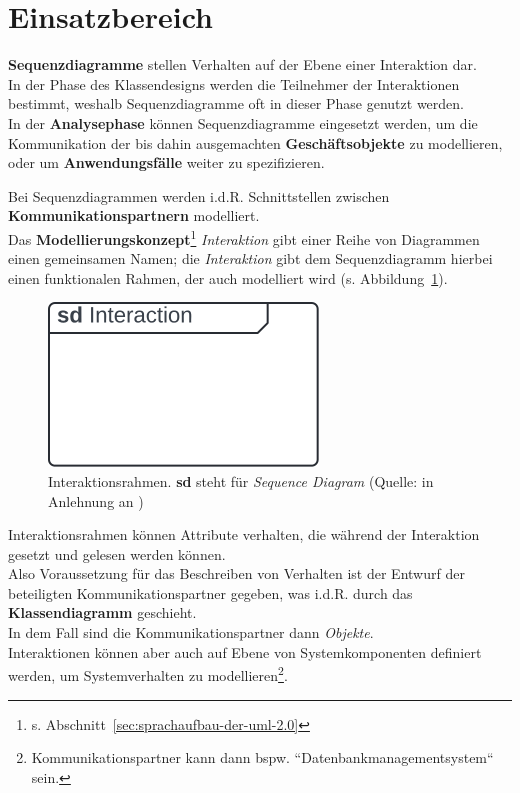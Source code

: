 \section{Einsatzbereich}

\begin{tcolorbox}
    \textbf{Sequenzdiagramme} stellen Verhalten auf der Ebene einer Interaktion dar.\\
    In der Phase des Klassendesigns werden die Teilnehmer der Interaktionen bestimmt, weshalb Sequenzdiagramme oft in dieser Phase genutzt werden.\\
    In der \textbf{Analysephase} können Sequenzdiagramme eingesetzt werden, um die Kommunikation der bis dahin ausgemachten \textbf{Geschäftsobjekte} zu modellieren, oder um \textbf{Anwendungsfälle} weiter zu spezifizieren.
\end{tcolorbox}

\noindent
Bei Sequenzdiagrammen werden i.d.R. Schnittstellen zwischen \textbf{Kommunikationspartnern} modelliert.\\

\noindent
Das \textbf{Modellierungskonzept}\footnote{
s. Abschnitt~\ref{sec:sprachaufbau-der-uml-2.0}
} \textit{Interaktion} gibt einer Reihe von Diagrammen einen gemeinsamen Namen; die \textit{Interaktion} gibt dem Sequenzdiagramm hierbei einen funktionalen Rahmen, der auch modelliert wird (s. Abbildung~\ref{fig:interaktionsrahmen}).\\

\begin{figure}
    \centering
    \includegraphics[scale=0.5]{part three/Sequenzdiagramme/img/interaktionsrahmen}
    \caption{Interaktionsrahmen. \textbf{sd} steht für \textit{Sequence Diagram} (Quelle: in Anlehnung an \cite[596]{OMG17})}
    \label{fig:interaktionsrahmen}
\end{figure}

\noindent
Interaktionsrahmen können Attribute verhalten, die während der Interaktion gesetzt und gelesen werden können.\\

\noindent
Also Voraussetzung für das Beschreiben von Verhalten ist der Entwurf der beteiligten Kommunikationspartner gegeben, was i.d.R. durch das \textbf{Klassendiagramm} geschieht.\\
In dem Fall sind die Kommunikationspartner dann \textit{Objekte}.\\

\noindent
Interaktionen können aber auch auf Ebene von Systemkomponenten definiert werden, um Systemverhalten zu modellieren\footnote{
Kommunikationspartner kann dann bspw. ``Datenbankmanagementsystem`` sein.
}.
